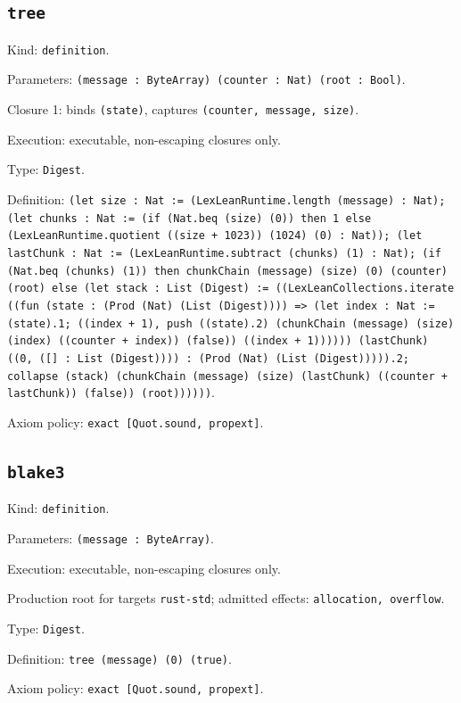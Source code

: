 \documentclass[11pt]{article}
\begin{document}
\subsection*{\texttt{tree}}
\noindent Kind: \texttt{definition}.\par
\noindent Parameters: \texttt{(message : ByteArray) (counter : Nat) (root : Bool)}.\par
\noindent Closure 1: binds \texttt{(state)}, captures \texttt{(counter, message, size)}.\par
\noindent Execution: executable, non-escaping closures only.\par
\noindent Type: \texttt{Digest}.\par
\noindent Definition: \texttt{(let size : Nat := (LexLeanRuntime.length (message) : Nat); (let chunks : Nat := (if (Nat.beq (size) (0)) then 1 else (LexLeanRuntime.quotient ((size + 1023)) (1024) (0) : Nat)); (let lastChunk : Nat := (LexLeanRuntime.subtract (chunks) (1) : Nat); (if (Nat.beq (chunks) (1)) then chunkChain (message) (size) (0) (counter) (root) else (let stack : List (Digest) := ((LexLeanCollections.iterate ((fun (state : (Prod (Nat) (List (Digest)))) => (let index : Nat := (state).1; ((index + 1), push ((state).2) (chunkChain (message) (size) (index) ((counter + index)) (false)) ((index + 1)))))) (lastChunk) ((0, ([] : List (Digest)))) : (Prod (Nat) (List (Digest))))).2; collapse (stack) (chunkChain (message) (size) (lastChunk) ((counter + lastChunk)) (false)) (root))))))}.\par
\noindent Axiom policy: \texttt{exact [Quot.sound, propext]}.\par
\subsection*{\texttt{blake3}}
\noindent Kind: \texttt{definition}.\par
\noindent Parameters: \texttt{(message : ByteArray)}.\par
\noindent Execution: executable, non-escaping closures only.\par
\noindent Production root for targets \texttt{rust-std}; admitted effects: \texttt{allocation, overflow}.\par
\noindent Type: \texttt{Digest}.\par
\noindent Definition: \texttt{tree (message) (0) (true)}.\par
\noindent Axiom policy: \texttt{exact [Quot.sound, propext]}.\par
\end{document}
